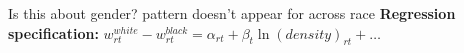 \begin{frame}{Is this about gender? pattern doesn't appear for across race}
	\label{slide:race}
	\textbf{\alert{Regression specification:}}	$w^{white}_{rt}-w^{black}_{rt}=\alpha_{rt}+\beta_{t}\ln(density)_{rt}+ \dots$
	
\end{frame}